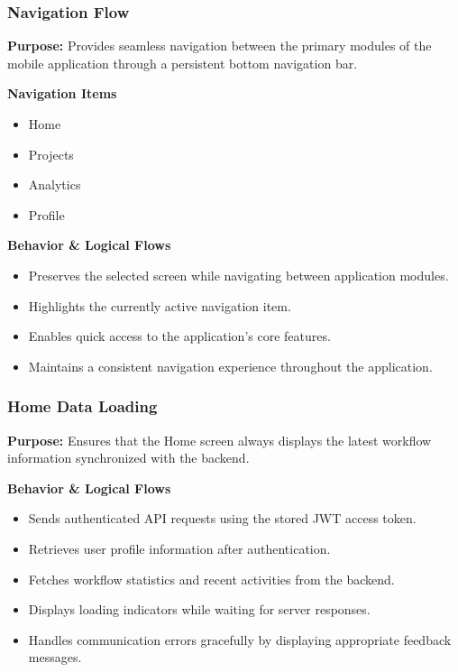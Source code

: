
\subsubsection{Navigation Flow}

\textbf{Purpose:}
Provides seamless navigation between the primary modules of the mobile application through a persistent bottom navigation bar.

\vspace{0.2cm}
\noindent\textbf{Navigation Items}

\begin{itemize}
    \item Home
    \item Projects
    \item Analytics
    \item Profile
\end{itemize}

\vspace{0.2cm}
\noindent\textbf{Behavior \& Logical Flows}

\begin{itemize}
    \item Preserves the selected screen while navigating between application modules.
    \item Highlights the currently active navigation item.
    \item Enables quick access to the application's core features.
    \item Maintains a consistent navigation experience throughout the application.
\end{itemize}


\subsubsection{Home Data Loading}

\textbf{Purpose:}
Ensures that the Home screen always displays the latest workflow information synchronized with the backend.

\vspace{0.2cm}
\noindent\textbf{Behavior \& Logical Flows}

\begin{itemize}
    \item Sends authenticated API requests using the stored JWT access token.
    \item Retrieves user profile information after authentication.
    \item Fetches workflow statistics and recent activities from the backend.
    \item Displays loading indicators while waiting for server responses.
    \item Handles communication errors gracefully by displaying appropriate feedback messages.
\end{itemize}